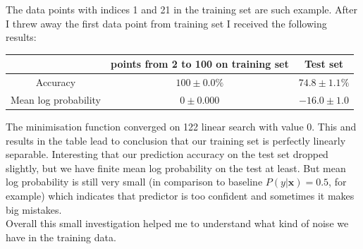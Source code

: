 \documentclass{article}
\newcommand{\vect}[1]{\boldsymbol{#1}} %
\begin{document}
\begin{enumerate}[label=(\alph*)]
						
						The data points with indices 1 and 21 in the training set are such example. After I threw away the first data point from training set I received the following results:
						\begin{center}
							\begin{tabular}{| c | c | c |}
								\hline
								\, & points from 2 to 100 on training set & Test set \\ 
								\hline
								Accuracy                  & $100 \pm 0.0 \% $ & $ 74.8 \pm 1.1  \%$ \\ 
								\hline
								Mean log probability &$ 0 \pm 0.000$ &  $ -16.0 \pm 1.0 $ \\
								\hline
							\end{tabular}
						\end{center}
						The minimisation function converged on 122 linear search with value 0. This and results in the table lead to conclusion that our training set is perfectly linearly separable. Interesting that our prediction accuracy on the test set dropped slightly, but we have  finite mean log probability on the test at least. But mean log probability is still very small (in comparison to baseline $P(y | \vect{x})=0.5$, for example) which indicates that predictor is too confident and sometimes it makes big mistakes. 
						\\
						Overall this small investigation helped me to understand what kind of noise we have in the training data. 
				\end{enumerate}
\end{document}
